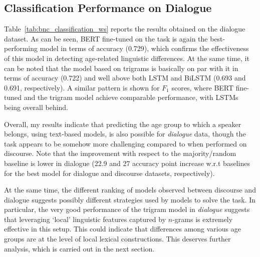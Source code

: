 \subsection{Classification Performance on Dialogue}
Table~\ref{tab:bnc_classification_ws} reports the results obtained on the dialogue dataset. As can be seen, BERT fine-tuned on the task is again the best-performing model in terms of accuracy (0.729), which confirms the effectiveness of this model in detecting age-related linguistic differences. At the same time, it can be noted that the model based on trigrams is basically on par with it in terms of accuracy (0.722) and well above both LSTM and BiLSTM (0.693 and 0.691, respectively). A similar pattern is shown for $F_1$ scores, where BERT fine-tuned and the trigram model achieve comparable performance, with LSTMs being overall behind. 

Overall, my results indicate that predicting the age group to which a speaker belongs, using text-based models, is also possible for \emph{dialogue} data, though the task appears to be somehow more challenging compared to when performed on discourse.
Note that the improvement with respect to the majority/random baseline is lower in dialogue (22.9 and 27 accuracy point increase w.r.t baselines for the best model for dialogue and discourse datasets, respectively).

At the same time, the different ranking of models observed between discourse and dialogue suggests possibly different strategies used by models to solve the task. In particular, the very good performance of the trigram model in \emph{dialogue} suggests that leveraging `local' linguistic features captured by $n$-grams is extremely effective in this setup. This could indicate that differences among various age groups are at the level of
local lexical constructions.
This deserves further analysis, which is carried out in the next section.


